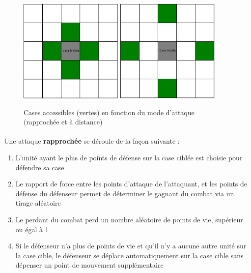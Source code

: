 \begin{figure}
  \centering
  \includegraphics[width=2in]{./schemas/near_attack.png}
  \includegraphics[width=2in]{./schemas/long_attack.png}
  \caption{Cases accessibles (vertes) en fonction du mode d'attaque (rapprochée et à distance)}
  \label{fig:attack}
\end{figure}

\paragraph{}
Une attaque \textbf{rapprochée} se déroule de la façon suivante :

\begin{enumerate}
  \item L'unité ayant le plus de points de défense sur la case ciblée est choisie pour défendre sa case
  \item Le rapport de force entre les points d'attaque de l'attaquant, et les points de défense du défenseur permet de déterminer le gagnant du combat via un tirage aléatoire
  \item Le perdant du combat perd un nombre aléatoire de points de vie, supérieur ou égal à 1
  \item Si le défenseur n'a plus de points de vie et qu'il n'y a aucune autre unité sur la case cible, le défenseur se déplace automatiquement sur la case cible sans dépenser un point de mouvement supplémentaire
\end{enumerate}

